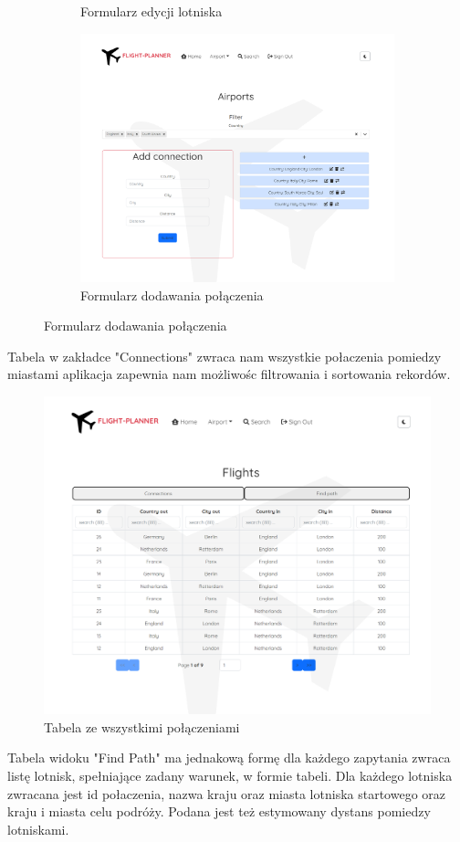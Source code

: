 \documentclass[12pt]{article}
\begin{document}
\begin{figure}[!ht]
\begin{subfigure}{.45\textwidth}
        \caption{Formularz edycji lotniska}
    \end{subfigure}
    \begin{subfigure}{.45\textwidth}
        \centering
        \includegraphics[width=0.95\linewidth]{6}  
        \caption{Formularz dodawania połączenia}
    \end{subfigure}
\end{figure}
\newpage
Tabela w zakładce "Connections" zwraca nam wszystkie połaczenia pomiedzy miastami aplikacja zapewnia nam możliwośc filtrowania i sortowania rekordów.\\
\begin{figure}[!ht]
    \centering
    \includegraphics[width=0.55\linewidth]{7}  
    \caption{Tabela ze wszystkimi połączeniami}
\end{figure}
Tabela widoku "Find Path" ma jednakową formę dla każdego zapytania zwraca listę lotnisk, spełniające zadany warunek, w formie tabeli. Dla każdego lotniska zwracana jest id połaczenia, nazwa kraju oraz miasta lotniska startowego oraz kraju i miasta celu podróży. Podana jest też estymowany dystans pomiedzy lotniskami.\\
\end{document}
